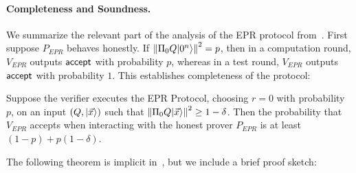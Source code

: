 












 













\paragraph{Completeness and Soundness.} 
We summarize the relevant part of the analysis of the EPR protocol from~\cite{broadbent15howtoverify}. First suppose $P_{EPR}$ behaves honestly. If $\left\|\Pi_0 Q|0^n\rangle\right\|^2=p$, then in a computation round, $V_{EPR}$ outputs $\sf accept$ with probability $p$, whereas in a test round, $V_{EPR}$ outputs $\sf accept$ with probability $1$. This establishes completeness of the protocol:

\begin{theorem}[Completeness]\label{thm:EPR-correctness} 
Suppose the verifier executes the EPR Protocol, choosing $r=0$ with probability $p$, on an input $(Q,|\vec{x}\rangle)$ such that $\left\|\Pi_0 Q|\vec{x}\rangle\right\|^2\geq 1-\delta$. Then the probability that $V_{EPR}$ accepts when interacting with the honest prover $P_{EPR}$ is at least $(1-p)+p(1-\delta)$. 
\end{theorem}

The following theorem is implicit in~\cite[Section 7.6]{broadbent15howtoverify}, but we include a brief proof sketch:

